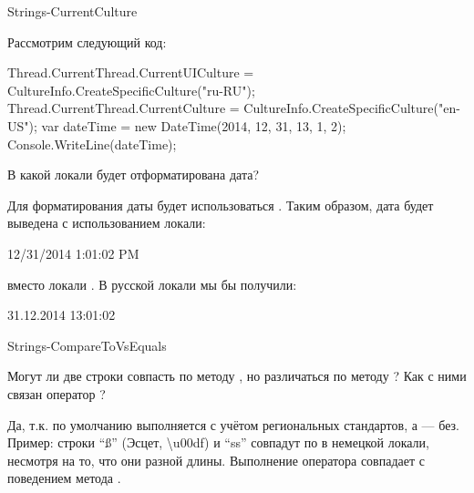 \begin{defproblem}{Strings-CurrentCulture}
\begin{onlyproblem}
  Рассмотрим следующий код:
  \begin{source}
  Thread.CurrentThread.CurrentUICulture = 
    CultureInfo.CreateSpecificCulture("ru-RU");
  Thread.CurrentThread.CurrentCulture = 
    CultureInfo.CreateSpecificCulture("en-US");
  var dateTime = new DateTime(2014, 12, 31, 13, 1, 2);
  Console.WriteLine(dateTime);
  \end{source}
  В какой локали будет отформатирована дата?
\end{onlyproblem}
\begin{onlysolution}
  Для форматирования даты будет использоваться . Таким образом, дата будет выведена с использованием  локали:
  \begin{source}
  12/31/2014 1:01:02 PM
  \end{source}
  вместо локали . В русской локали мы бы получили:
  \begin{source}
  31.12.2014 13:01:02
  \end{source}
\end{onlysolution}
\end{defproblem}
\begin{defproblem}{Strings-CompareToVsEquals}
\begin{onlyproblem}
  Могут ли две строки совпасть по методу , но различаться по методу ? Как с ними связан оператор \code{==}?
\end{onlyproblem}
\begin{onlysolution}
  Да, т.к. по умолчанию  выполняется с учётом региональных стандартов, а  — без.\newline
  Пример: строки ``\ss'' (Эсцет, \textbackslash u00df) и ``ss'' совпадут по  в немецкой локали, несмотря на то, что они разной длины.\newline
  Выполнение оператора \code{==} совпадает с поведением метода .
\end{onlysolution}
\end{defproblem}
